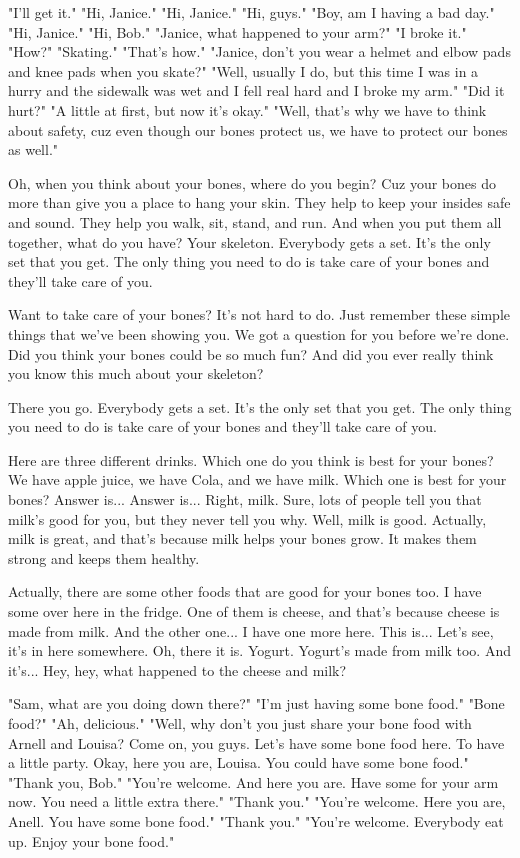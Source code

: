 "I'll get it." "Hi, Janice." "Hi, Janice." "Hi, guys." "Boy, am I having a bad day." "Hi, Janice." "Hi, Bob." "Janice, what happened to your arm?" "I broke it." "How?" "Skating." "That's how." "Janice, don't you wear a helmet and elbow pads and knee pads when you skate?" "Well, usually I do, but this time I was in a hurry and the sidewalk was wet and I fell real hard and I broke my arm." "Did it hurt?" "A little at first, but now it's okay." "Well, that's why we have to think about safety, cuz even though our bones protect us, we have to protect our bones as well."

Oh, when you think about your bones, where do you begin? Cuz your bones do more than give you a place to hang your skin. They help to keep your insides safe and sound. They help you walk, sit, stand, and run. And when you put them all together, what do you have? Your skeleton. Everybody gets a set. It's the only set that you get. The only thing you need to do is take care of your bones and they'll take care of you.

Want to take care of your bones? It's not hard to do. Just remember these simple things that we've been showing you. We got a question for you before we're done. Did you think your bones could be so much fun? And did you ever really think you know this much about your skeleton?

There you go. Everybody gets a set. It's the only set that you get. The only thing you need to do is take care of your bones and they'll take care of you.

Here are three different drinks. Which one do you think is best for your bones? We have apple juice, we have Cola, and we have milk. Which one is best for your bones? Answer is... Answer is... Right, milk. Sure, lots of people tell you that milk's good for you, but they never tell you why. Well, milk is good. Actually, milk is great, and that's because milk helps your bones grow. It makes them strong and keeps them healthy.

Actually, there are some other foods that are good for your bones too. I have some over here in the fridge. One of them is cheese, and that's because cheese is made from milk. And the other one... I have one more here. This is... Let's see, it's in here somewhere. Oh, there it is. Yogurt. Yogurt's made from milk too. And it's... Hey, hey, what happened to the cheese and milk?

"Sam, what are you doing down there?" "I'm just having some bone food." "Bone food?" "Ah, delicious." "Well, why don't you just share your bone food with Arnell and Louisa? Come on, you guys. Let's have some bone food here. To have a little party. Okay, here you are, Louisa. You could have some bone food." "Thank you, Bob." "You're welcome. And here you are. Have some for your arm now. You need a little extra there." "Thank you." "You're welcome. Here you are, Anell. You have some bone food." "Thank you." "You're welcome. Everybody eat up. Enjoy your bone food."


